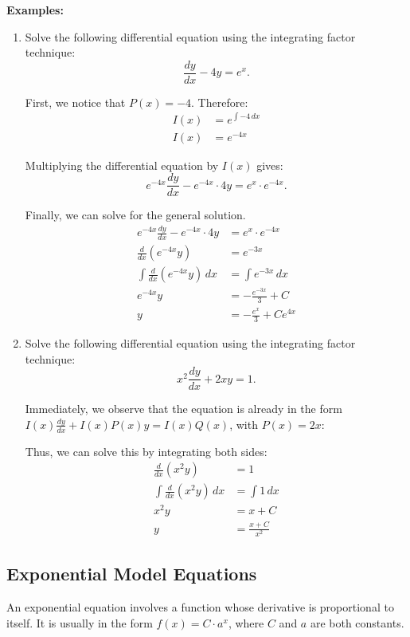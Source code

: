 \documentclass[12pt]{article}
\begin{document}
\noindent \textbf{Examples:}
\begin{enumerate}
	\item Solve the following differential equation using the integrating factor technique:
	\[ \frac{dy}{dx} - 4y = e^x. \]

	First, we notice that $P(x) = -4$. Therefore:
	\begin{align*}
		I(x) &= e^{\int -4 \, dx} \\
		I(x) &= e^{-4x}
	\end{align*}

	Multiplying the differential equation by $I(x)$ gives:
	\[ e^{-4x} \frac{dy}{dx} - e^{-4x} \cdot 4y = e^x \cdot e^{-4x}. \]

	Finally, we can solve for the general solution.
	\begin{align*}
		e^{-4x} \frac{dy}{dx} - e^{-4x} \cdot 4y &= e^x \cdot e^{-4x} \\[5pt]
		\frac{d}{dx} \left( e^{-4x}y \right) &= e^{-3x} \\[5pt]
		\int \frac{d}{dx} \left( e^{-4x}y \right) \, dx &= \int e^{-3x} \, dx \\[5pt]
		e^{-4x}y &= -\frac{e^{-3x}}{3} + C \\[5pt]
		y &= -\frac{e^x}{3} + C e^{4x}
	\end{align*}

	\item Solve the following differential equation using the integrating factor technique:
	\[ x^2 \frac{dy}{dx} + 2xy = 1. \]

	Immediately, we observe that the equation is already in the form $I(x) \frac{dy}{dx} + I(x) P(x)y = I(x) Q(x)$, with $P(x) = 2x$:

	Thus, we can solve this by integrating both sides:
	\begin{align*}
		\frac{d}{dx} \left( x^2 y \right) &= 1 \\[5pt]
		\int \frac{d}{dx} \left( x^2 y \right) \, dx &= \int 1 \, dx \\[5pt]
		x^2 y &= x + C \\
		y &= \frac{x + C}{x^2}
	\end{align*}
\end{enumerate}

\subsection{Exponential Model Equations}
An exponential equation involves a function whose derivative is proportional to itself. It is usually in the form $f(x) = C \cdot a^x$, where $C$ and $a$ are both constants.
\end{document}
